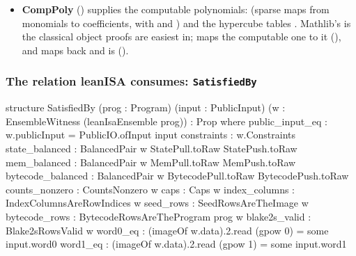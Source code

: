 \begin{itemize}
  runs a malicious prover against the verifier, applies a named straight-line extractor to the
  transcript, and bounds the probability that the verifier accepts \emph{and} no witness in the
  extractor's  slot is valid. Statement and witness types are in . A
   () is a map on witnesses sending
  every witness valid for  to one valid for ; its two witness universes are
  independent (probe , output lines 10--13).
\item \textbf{CompPoly} () supplies the computable polynomials:
   (sparse maps from monomials to coefficients, with  and
  ) and the hypercube tables . Mathlib's
   is the classical object proofs are easiest in; 
  maps the computable one to it (), and 
  maps back and is  ().
\end{itemize}

\subsubsection{The relation leanISA consumes: \texorpdfstring{\protect\texttt{SatisfiedBy}}{SatisfiedBy}}\label{sec:gen-boundary-satisfiedby}

\begin{leancode}
structure SatisfiedBy (prog : Program) (input : PublicInput)
    (w : EnsembleWitness (leanIsaEnsemble prog)) : Prop where
  public_input_eq : w.publicInput = PublicIO.ofInput input
  constraints : w.Constraints
  state_balanced : BalancedPair w StatePull.toRaw StatePush.toRaw
  mem_balanced : BalancedPair w MemPull.toRaw MemPush.toRaw
  bytecode_balanced : BalancedPair w BytecodePull.toRaw BytecodePush.toRaw
  counts_nonzero : CountsNonzero w
  caps : Caps w
  index_columns : IndexColumnsAreRowIndices w
  seed_rows : SeedRowsAreTheImage w
  bytecode_rows : BytecodeRowsAreTheProgram prog w
  blake2s_valid : Blake2sRowsValid w
  word0_eq : (imageOf w.data).2.read (gpow 0) = some input.word0
  word1_eq : (imageOf w.data).2.read (gpow 1) = some input.word1
\end{leancode}


